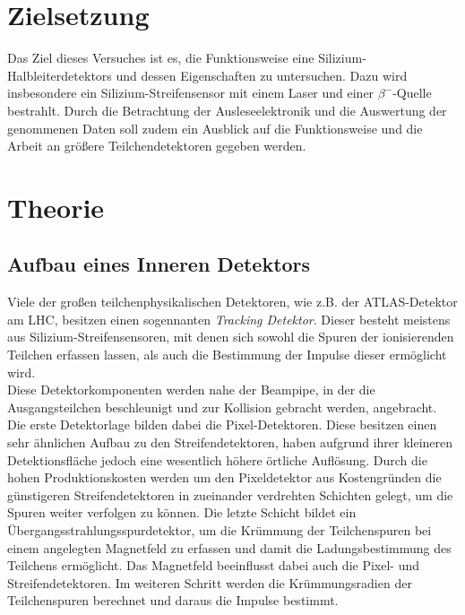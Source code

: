 \section{Zielsetzung}
\label{sec:Zielsetzung}

Das Ziel dieses Versuches ist es, die Funktionsweise eine Silizium-Halbleiterdetektors und dessen Eigenschaften zu untersuchen. Dazu wird insbesondere ein Silizium-Streifensensor mit einem Laser und einer $\beta^{-}$-Quelle bestrahlt. Durch die Betrachtung der Ausleseelektronik und die Auswertung der genommenen Daten soll zudem ein Ausblick auf die Funktionsweise und die Arbeit an größere Teilchendetektoren gegeben werden.

\section{Theorie}
\label{sec:Theorie}
\subsection{Aufbau eines Inneren Detektors}

Viele der großen teilchenphysikalischen Detektoren, wie z.B. der ATLAS-Detektor am LHC, besitzen einen sogennanten \textit{Tracking Detektor}. Dieser besteht meistens aus Silizium-Streifensensoren, mit denen sich sowohl die Spuren der ionisierenden Teilchen erfassen lassen, als auch die Bestimmung der Impulse dieser ermöglicht wird.\\
Diese Detektorkomponenten werden nahe der Beampipe, in der die Ausgangsteilchen beschleunigt und zur Kollision gebracht werden, angebracht. Die erste Detektorlage bilden dabei die Pixel-Detektoren. Diese besitzen einen sehr ähnlichen Aufbau zu den Streifendetektoren, haben aufgrund ihrer kleineren Detektionsfläche jedoch eine wesentlich höhere örtliche Auflösung. Durch die hohen Produktionskosten werden um den Pixeldetektor aus Kostengründen die günstigeren Streifendetektoren in zueinander verdrehten Schichten gelegt, um die Spuren weiter verfolgen zu können. Die letzte Schicht bildet ein Übergangsstrahlungsspurdetektor, um die Krümmung der Teilchenspuren bei einem angelegten Magnetfeld zu erfassen und damit die Ladungsbestimmung des Teilchens ermöglicht. Das Magnetfeld beeinflusst dabei auch die Pixel- und Streifendetektoren. Im weiteren Schritt werden die Krümmungsradien der Teilchenspuren berechnet und daraus die Impulse bestimmt.

